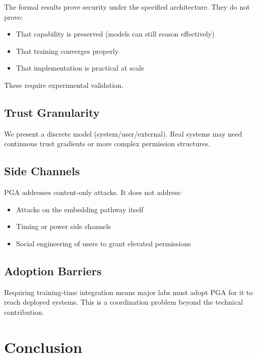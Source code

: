 \documentclass[11pt,a4paper]{article}
\theoremstyle{plain}
\theoremstyle{definition}
\theoremstyle{remark}
\begin{document}
The formal results prove security under the specified architecture. They do not prove:

\begin{itemize}[noitemsep]
    \item That capability is preserved (models can still reason effectively)
    \item That training converges properly
    \item That implementation is practical at scale
\end{itemize}

These require experimental validation.

\subsection{Trust Granularity}

We present a discrete model (system/user/external). Real systems may need continuous trust gradients or more complex permission structures.

\subsection{Side Channels}

PGA addresses content-only attacks. It does not address:

\begin{itemize}[noitemsep]
    \item Attacks on the embedding pathway itself
    \item Timing or power side channels
    \item Social engineering of users to grant elevated permissions
\end{itemize}

\subsection{Adoption Barriers}

Requiring training-time integration means major labs must adopt PGA for it to reach deployed systems. This is a coordination problem beyond the technical contribution.

\section{Conclusion}
\end{document}
